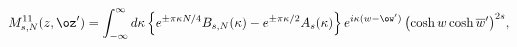 \begin{equation}
M_{s,N}^{11}(z,\oz')=\int_{-\infty}^{\infty}d\kappa\,
\Bigl\{e^{\pm \pi\kappa N/4}B_{s,N}(\kappa)-e^{\pm\pi\kappa/2}
A_s(\kappa)\Bigr\}\,
e^{i\kappa(w-\ow')}\,\bigl(
\cosh w\cosh\overline{w}'
\bigr)^{2s},
\label{Ms11}
\end{equation}

